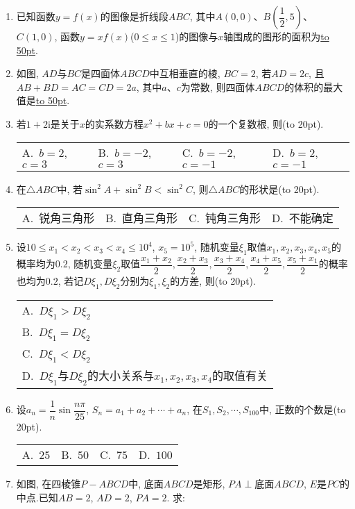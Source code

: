 \documentclass[10pt,a4paper]{article}
\newcommand{\blank}[1]{\underline{\hbox to #1pt{}}}
\newcommand{\bracket}[1]{(\hbox to #1pt{})}
\newcommand{\onech}[4]{\par\begin{tabular}{p{.9\textwidth}}
A.~#1\\
B.~#2\\
C.~#3\\
D.~#4
\end{tabular}}
\newcommand{\fourch}[4]{\par\begin{tabular}{p{.23\textwidth}p{.23\textwidth}p{.23\textwidth}p{.23\textwidth}}
A.~#1 &B.~#2& C.~#3& D.~#4
\end{tabular}}
\begin{document}
\begin{enumerate}[1.]
\item 已知函数$y=f(x)$的图像是折线段$ABC$, 其中$A(0,0)$、$B(\dfrac 12,5)$、$C(1,0)$, 函数$y=xf(x)$($0\le x\le 1$)的图像与$x$轴围成的图形的面积为\blank{50}.
\item 如图, $AD$与$BC$是四面体$ABCD$中互相垂直的棱, $BC=2$, 若$AD=2c$,
且$AB+BD=AC=CD=2a$, 其中$a$、$c$为常数, 则四面体$ABCD$的体积的最大值是\blank{50}.
\begin{center}
\end{center}
\item 若$1+2\mathrm{i}$是关于$x$的实系数方程$x^2+bx+c=0$的一个复数根, 则\bracket{20}.
\fourch{$b=2$, $c=3$}{$b=-2$, $c=3$}{$b=-2$, $c=-1$}{$b=2$, $c=-1$}
\item 在$\triangle ABC$中, 若$\sin^2 A+\sin^2 B<\sin^2 C$, 则$\triangle ABC$的形状是\bracket{20}.
\fourch{锐角三角形}{直角三角形}{钝角三角形}{不能确定}
\item 设$10\le x_1<x_2<x_3<x_4\le 10^4$, $x_5=10^5$, 随机变量$\xi_1$取值$x_1,x_2,x_3,x_4,x_5$的概率均为$0.2$, 随机变量$\xi_2$取值$\dfrac{x_1+x_2}2, \dfrac{x_2+x_3}2, \dfrac{x_3+x_4}2, \dfrac{x_4+x_5}2, \dfrac{x_5+x_1}2$的概率也均为$0.2$, 若记$D\xi_1,D\xi_2$分别为$\xi_1,\xi_2$的方差, 则\bracket{20}.
\onech{$D\xi_1>D\xi_2$}{$D\xi_1=D\xi_2$}{$D\xi_1<D\xi_2$}{$D\xi_1$与$D\xi_2$的大小关系与$x_1,x_2,x_3,x_4$的取值有关}
\item 设$a_n=\dfrac 1n\sin \dfrac{n\pi}{25}$, $S_n=a_1+a_2+\cdots+a_n$, 在$S_1,S_2,\cdots,S_{100}$中, 正数的个数是\bracket{20}.
\fourch{$25$}{$50$}{$75$}{$100$}
\item 如图, 在四棱锥$P-ABCD$中, 底面$ABCD$是矩形, $PA\perp$底面$ABCD$, $E$是$PC$的中点.已知$AB=2$, $AD=2$, $PA=2$. 求:
\begin{center}
\end{center}
\end{enumerate}
\end{document}
